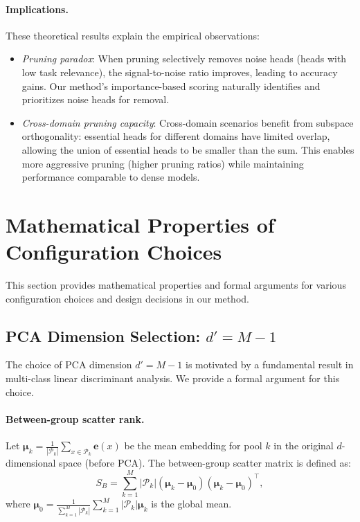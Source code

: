 \paragraph{Implications.}
These theoretical results explain the empirical observations:
\begin{itemize}
    \item \emph{Pruning paradox}: When pruning selectively removes noise heads (heads with low task relevance), the signal-to-noise ratio improves, leading to accuracy gains.
    Our method's importance-based scoring naturally identifies and prioritizes noise heads for removal.
    
    \item \emph{Cross-domain pruning capacity}: Cross-domain scenarios benefit from subspace orthogonality: essential heads for different domains have limited overlap, allowing the union of essential heads to be smaller than the sum.
    This enables more aggressive pruning (higher pruning ratios) while maintaining performance comparable to dense models.
\end{itemize}

\section{Mathematical Properties of Configuration Choices}
\label{app:math_configuration}

This section provides mathematical properties and formal arguments for various configuration choices and design decisions in our method.

\subsection{PCA Dimension Selection: $d' = M-1$}
\label{app:math_pca_dim}

The choice of PCA dimension $d' = M-1$ is motivated by a fundamental result in multi-class linear discriminant analysis.
We provide a formal argument for this choice.

\paragraph{Between-group scatter rank.}
Let $\boldsymbol{\mu}_k = \frac{1}{|\mathcal{P}_k|} \sum_{x \in \mathcal{P}_k} \mathbf{e}(x)$ be the mean embedding for pool $k$ in the original $d$-dimensional space (before PCA).
The between-group scatter matrix is defined as:
\begin{equation}
S_B = \sum_{k=1}^{M} |\mathcal{P}_k| (\boldsymbol{\mu}_k - \boldsymbol{\mu}_0)(\boldsymbol{\mu}_k - \boldsymbol{\mu}_0)^\top,
\end{equation}
where $\boldsymbol{\mu}_0 = \frac{1}{\sum_{k=1}^{M} |\mathcal{P}_k|} \sum_{k=1}^{M} |\mathcal{P}_k| \boldsymbol{\mu}_k$ is the global mean.

